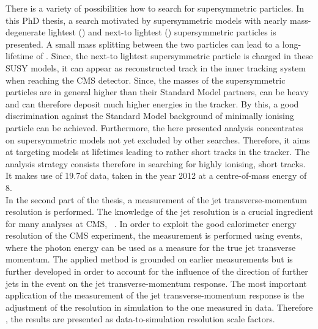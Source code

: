 There is a variety of possibilities how to search for supersymmetric particles.
In this PhD thesis, a search motivated by supersymmetric models with nearly mass-degenerate lightest (\chiO) and next-to lightest (\chipm) supersymmetric particles is presented.
A small mass splitting between the two particles can lead to a long-lifetime of \chipm.
Since, the next-to lightest supersymmetric particle is charged in these SUSY models, it can appear as reconstructed track in the inner tracking system when reaching the CMS detector. 
Since, the masses of the supersymmetric particles are in general higher than their Standard Model partners, \chipm can be heavy and can therefore deposit much higher energies in the tracker.
By this, a good discrimination against the Standard Model background of minimally ionising particle can be achieved.
Furthermore, the here presented analysis concentrates on supersymmetric models not yet excluded by other searches. 
Therefore, it aims at targeting models at \chipm lifetimes leading to rather short tracks in the tracker. 
The analysis strategy consists therefore in searching for highly ionising, short tracks.
It makes use of 19.7\fbinv of data, taken in the year 2012 at a centre-of-mass energy of 8\tev.\\

In the second part of the thesis, a measurement of the jet transverse-momentum resolution is performed.
The knowledge of the jet \pt resolution is a crucial ingredient for many analyses at CMS, \eg~\cite{FIXME}.
In order to exploit the good calorimeter energy resolution of the CMS experiment, the measurement is performed using \GAMJET events, where the photon energy can be used as a measure for the true jet transverse momentum.
The applied method is grounded on earlier measurements but is further developed in order to account for the influence of the direction of further jets in the event on the jet transverse-momentum response.
The most important application of the measurement of the jet transverse-momentum response is the adjustment of the resolution in simulation to the one measured in data.
Therefore , the results are presented as data-to-simulation resolution scale factors.\\

